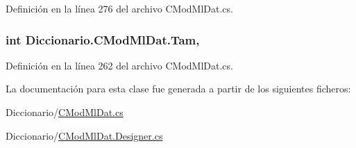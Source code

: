 Definición en la línea 276 del archivo C\-Mod\-Ml\-Dat.\-cs.

\hypertarget{class_diccionario_1_1_c_mod_ml_dat_afe204f217d519f0edcb13e40ea4008ac}{
\subsubsection[{Tam}]{\setlength{\rightskip}{0pt plus 5cm}int Diccionario.\-C\-Mod\-Ml\-Dat.\-Tam\hspace{0.3cm}{\ttfamily [get]}, {\ttfamily [set]}}}\label{class_diccionario_1_1_c_mod_ml_dat_afe204f217d519f0edcb13e40ea4008ac}


Definición en la línea 262 del archivo C\-Mod\-Ml\-Dat.\-cs.



La documentación para esta clase fue generada a partir de los siguientes ficheros\-:\begin{DoxyCompactItemize}
\item 
Diccionario/\hyperlink{_c_mod_ml_dat_8cs}{C\-Mod\-Ml\-Dat.\-cs}\item 
Diccionario/\hyperlink{_c_mod_ml_dat_8_designer_8cs}{C\-Mod\-Ml\-Dat.\-Designer.\-cs}\end{DoxyCompactItemize}
